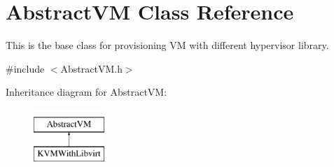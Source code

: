 \hypertarget{classAbstractVM}{\section{\-Abstract\-V\-M \-Class \-Reference}
\label{classAbstractVM}
}


\-This is the base class for provisioning \-V\-M with different hypervisor library.  




{\ttfamily \#include $<$\-Abstract\-V\-M.\-h$>$}

\-Inheritance diagram for \-Abstract\-V\-M\-:\begin{figure}[H]
\begin{center}
\leavevmode
\includegraphics[height=2.000000cm]{classAbstractVM}
\end{center}
\end{figure}
